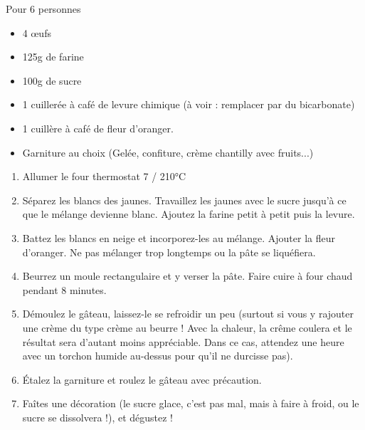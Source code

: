 \bigskip
{}
{Pour 6 personnes}{\begin{itemize}
	\item 4 \oe ufs
	\item 125g de farine
	\item 100g de sucre
	\item 1 cuillerée à café de levure chimique (à voir : remplacer par du bicarbonate)
	\item 1 cuillère à café de fleur d'oranger.
	\item Garniture au choix (Gelée, confiture, crème chantilly avec fruits...)
\end{itemize}}
{\begin{enumerate}
	\item Allumer le four thermostat 7 / 210°C
	\item Séparez les blancs des jaunes. Travaillez les jaunes avec le sucre jusqu'à ce que le mélange devienne blanc. Ajoutez la farine petit à petit puis la levure.
	\item Battez les blancs en neige et incorporez-les au mélange. Ajouter la fleur d'oranger. Ne pas mélanger trop longtemps ou la pâte se liquéfiera.
	\item Beurrez un moule rectangulaire et y verser la pâte. Faire cuire à four chaud pendant 8 minutes.
	\item Démoulez le gâteau, laissez-le se refroidir un peu (surtout si vous y rajouter une crème du type crème au beurre ! Avec la chaleur, la crême coulera et le résultat sera d'autant moins appréciable. Dans ce cas, attendez une heure avec un torchon humide au-dessus pour qu'il ne durcisse pas). 
	\item Étalez la garniture et roulez le gâteau avec précaution. 
	\item Faîtes une décoration (le sucre glace, c'est pas mal, mais à faire à froid, ou le sucre se dissolvera !), et dégustez !
\end{enumerate}}

